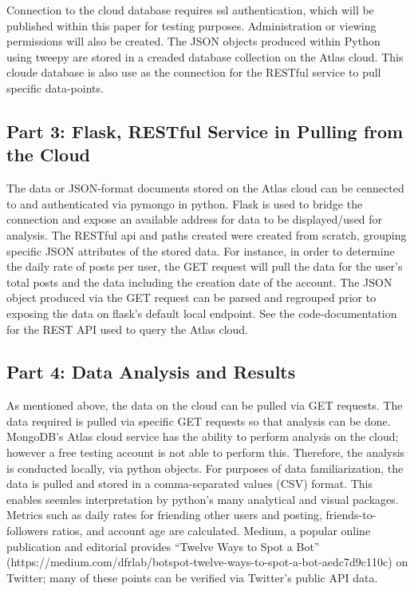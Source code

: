  Connection to the cloud database requires ssl authentication, which will be published within this paper for testing purposes. Administration or viewing permissions will also be created. The JSON objects produced within Python using tweepy are stored in a creaded database collection on the Atlas cloud. This cloude database is also use as the connection for the RESTful service to pull specific data-points.

 \subsection{Part 3: Flask, RESTful Service in Pulling from the Cloud}

 The data or JSON-format documents stored on the Atlas cloud can be cennected to and authenticated via pymongo in python. Flask is used to bridge the connection and expose an available address for data to be displayed/used for analysis. The RESTful api and paths created were created from scratch, grouping specific JSON attributes of the stored data. For instance, in order to determine the daily rate of posts per user, the GET request will pull the data for the user's total posts and the data including the creation date of the account. The JSON object produced via the GET request can be parsed and regrouped prior to exposing the data on flask's default local endpoint. See the code-documentation for the REST API used to query the Atlas cloud.

 \subsection{Part 4: Data Analysis and Results}

 As mentioned above, the data on the cloud can be pulled via GET requests. The data required is pulled via specific GET requests so that analysis can be done. MongoDB's Atlas cloud service has the ability to perform analysis on the cloud; however a free testing account is not able to perform this. Therefore, the analysis is conducted locally, via python objects. For purposes of data familiarization, the data is pulled and stored in a comma-separated values (CSV) format. This enables seemles interpretation by python's many analytical and visual packages. Metrics such as daily rates for friending other users and posting, friends-to-followers ratios, and account age are calculated. Medium, a popular online publication and editorial provides ``Twelve Ways to Spot a Bot'' (https://medium.com/dfrlab/botspot-twelve-ways-to-spot-a-bot-aedc7d9c110c) on Twitter; many of these points can be verified via Twitter's public API data.

